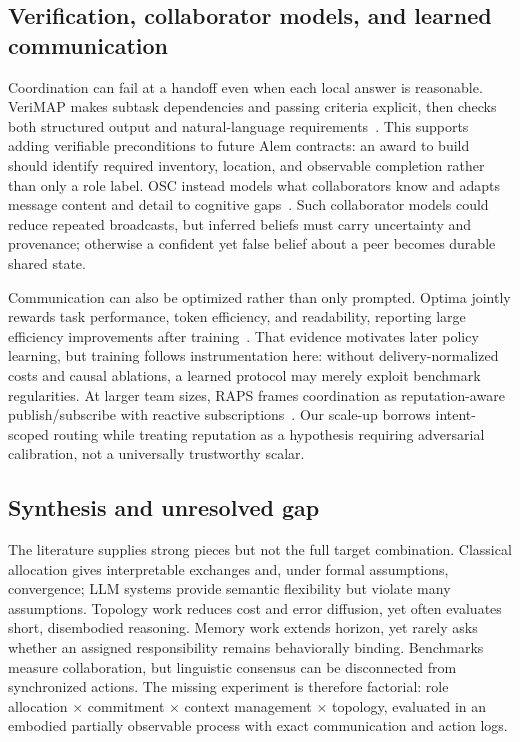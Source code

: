 \documentclass[11pt]{article}
\begin{document}
\subsection{Verification, collaborator models, and learned communication}
Coordination can fail at a handoff even when each local answer is reasonable. VeriMAP makes subtask dependencies and passing criteria explicit, then checks both structured output and natural-language requirements~\citep{verimap2026}. This supports adding verifiable preconditions to future Alem contracts: an award to build should identify required inventory, location, and observable completion rather than only a role label. OSC instead models what collaborators know and adapts message content and detail to cognitive gaps~\citep{osc2025}. Such collaborator models could reduce repeated broadcasts, but inferred beliefs must carry uncertainty and provenance; otherwise a confident yet false belief about a peer becomes durable shared state.

Communication can also be optimized rather than only prompted. Optima jointly rewards task performance, token efficiency, and readability, reporting large efficiency improvements after training~\citep{optima2025}. That evidence motivates later policy learning, but training follows instrumentation here: without delivery-normalized costs and causal ablations, a learned protocol may merely exploit benchmark regularities. At larger team sizes, RAPS frames coordination as reputation-aware publish/subscribe with reactive subscriptions~\citep{raps2026}. Our scale-up borrows intent-scoped routing while treating reputation as a hypothesis requiring adversarial calibration, not a universally trustworthy scalar.

\subsection{Synthesis and unresolved gap}
The literature supplies strong pieces but not the full target combination. Classical allocation gives interpretable exchanges and, under formal assumptions, convergence; LLM systems provide semantic flexibility but violate many assumptions. Topology work reduces cost and error diffusion, yet often evaluates short, disembodied reasoning. Memory work extends horizon, yet rarely asks whether an assigned responsibility remains behaviorally binding. Benchmarks measure collaboration, but linguistic consensus can be disconnected from synchronized actions. The missing experiment is therefore factorial: role allocation $\times$ commitment $\times$ context management $\times$ topology, evaluated in an embodied partially observable process with exact communication and action logs.
\end{document}
